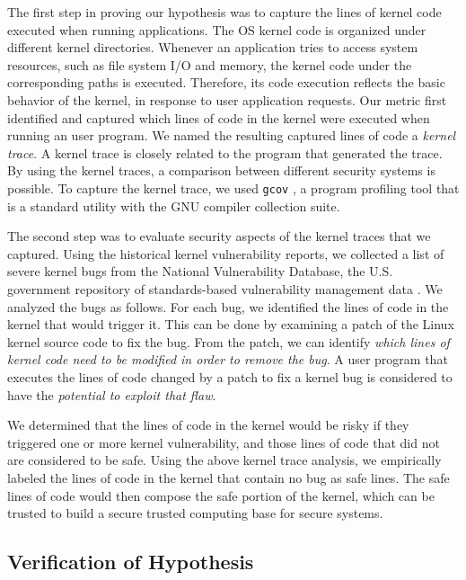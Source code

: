The first step in proving our hypothesis was to capture the lines of kernel
code executed 
when running applications. The OS kernel code is organized under different
kernel directories. 
Whenever an application tries to access system resources, such as file
system I/O and memory, 
the kernel code under the corresponding paths is executed. Therefore, 
its code execution reflects the basic behavior of the kernel, in response
to user application requests. 
Our metric first identified and captured which lines of code in the kernel
were executed 
when running an user program. We named the resulting captured lines of
code a \textit{kernel trace}. 
A kernel trace is closely related to the program that generated the trace. 
By using the kernel traces, a comparison between different
security systems is possible. 
To capture the kernel trace, we used \texttt{gcov} \cite{gcov}, a program profiling
tool that is a standard utility with the GNU compiler collection 
suite. 

The second step was to evaluate security aspects of the kernel traces that
we captured. 
Using the historical kernel vulnerability reports, we collected a list of
severe kernel bugs from 
the National Vulnerability Database, the U.S. government repository of
standards-based 
vulnerability management data \cite{NVD}. We analyzed the bugs as
follows. For each bug, we identified the lines of code 
in the kernel that would trigger it. This can be done by examining 
a patch of the Linux kernel source code to fix the bug. From the patch, 
we can identify \textit{which lines of kernel code need to be modified in order to
remove the bug}. 
A user program that executes the lines of code changed by a patch to fix a
kernel bug is considered to have the \textit{potential to exploit that flaw}.

We determined that the lines of code in the kernel would be risky 
if they triggered one or more kernel vulnerability, and those lines of code 
that did not are considered to be safe. Using the above kernel trace
analysis, 
we empirically labeled the lines of code in the kernel that contain no
bug as safe lines.
The safe lines of code would then compose the safe portion of the kernel, 
which can be trusted to build a secure trusted computing base for secure
systems.

\subsection{Verification of Hypothesis}
\label{Verification-of-Hypothesis}

